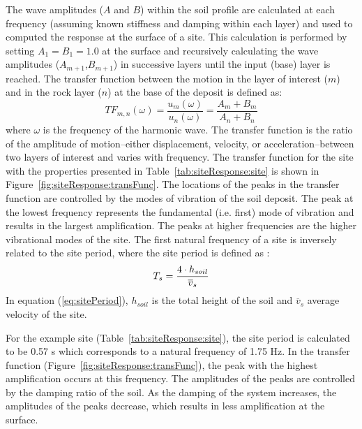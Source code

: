 \documentclass[12pt,oneside]{book}
\begin{document}
The wave amplitudes ($A$ and $B$) within the soil profile are calculated at each
frequency (assuming known stiffness and damping within each layer) and used to
computed the response at the surface of a site.  This calculation is performed
by setting $A_{1}=B_{1}=1.0$ at the surface and recursively calculating the wave
amplitudes ($A_{m+1}$,$B_{m+1}$) in successive layers until the input (base)
layer is reached.  The transfer function between the motion in the layer of
interest ($m$) and in the rock layer ($n$) at the base of the deposit is defined
as:
\begin{equation}
    TF_{m,n}(\omega) = \frac{u_m(\omega)}{u_n(\omega)}= \frac{A_m + B_m}{A_n + B_n}
    \label{eq:transFunc}
\end{equation}
where $\omega$ is the frequency of the harmonic wave.  The transfer function is
the ratio of the amplitude of motion--either displacement, velocity, or
acceleration--between two layers of interest and varies with frequency.  The
transfer function for the site with the properties presented in
Table~\ref{tab:siteResponse:site} is shown in
Figure~\ref{fig:siteResponse:transFunc}.  The locations of the peaks in the
transfer function are controlled by the modes of vibration of the soil deposit.
The peak at the lowest frequency represents the fundamental (i.e. first) mode of
vibration and results in the largest amplification.  The peaks at higher
frequencies are the higher vibrational modes of the site.  The first natural
frequency of a site is inversely related to the site period, where the site
period is defined as \citep{kramer:96}:
\begin{equation}
    T_s = \frac{4\cdot h_{soil}}{\overline{v}_s}\\ 
    \label{eq:sitePeriod}
\end{equation}
In equation (\ref{eq:sitePeriod}), $h_{soil}$ is the total height of the soil
and $\overline{v}_s$ average velocity of the site.  

For the example site (Table~\ref{tab:siteResponse:site}), the site period is
calculated to be 0.57 s which corresponds to a natural frequency of 1.75 Hz.  In
the transfer function (Figure~\ref{fig:siteResponse:transFunc}), the peak with
the highest amplification occurs at this frequency.  The amplitudes of the peaks
are controlled by the damping ratio of the soil. As the damping of the system
increases, the amplitudes of the peaks decrease, which results in less
amplification at the surface.
\end{document}
